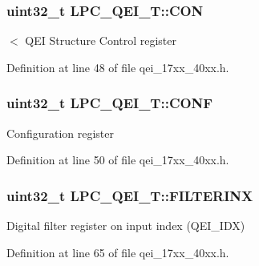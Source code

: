 \subsubsection[{\texorpdfstring{C\+ON}{CON}}]{ uint32\+\_\+t L\+P\+C\+\_\+\+Q\+E\+I\+\_\+\+T\+::\+C\+ON}\hypertarget{structLPC__QEI__T_af84cacebc1e4ba309cb8c1af4acca96f}{}\label{structLPC__QEI__T_af84cacebc1e4ba309cb8c1af4acca96f}
$<$ Q\+EI Structure Control register 

Definition at line 48 of file qei\+\_\+17xx\+\_\+40xx.\+h.

\subsubsection[{\texorpdfstring{C\+O\+NF}{CONF}}]{ uint32\+\_\+t L\+P\+C\+\_\+\+Q\+E\+I\+\_\+\+T\+::\+C\+O\+NF}\hypertarget{structLPC__QEI__T_a72886edbac2779ab5e2823fd0db339f7}{}\label{structLPC__QEI__T_a72886edbac2779ab5e2823fd0db339f7}
Configuration register 

Definition at line 50 of file qei\+\_\+17xx\+\_\+40xx.\+h.

\subsubsection[{\texorpdfstring{F\+I\+L\+T\+E\+R\+I\+NX}{FILTERINX}}]{ uint32\+\_\+t L\+P\+C\+\_\+\+Q\+E\+I\+\_\+\+T\+::\+F\+I\+L\+T\+E\+R\+I\+NX}\hypertarget{structLPC__QEI__T_a92cbc5ae36dcd7194b4b1f3d448ca2e5}{}\label{structLPC__QEI__T_a92cbc5ae36dcd7194b4b1f3d448ca2e5}
Digital filter register on input index (Q\+E\+I\+\_\+\+I\+DX) 

Definition at line 65 of file qei\+\_\+17xx\+\_\+40xx.\+h.

